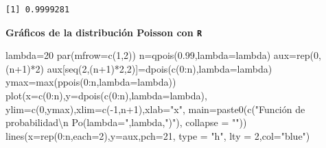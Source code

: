 \documentclass[
  letterpaper,
  DIV=11,
  numbers=noendperiod]{scrreprt}
\newenvironment{Shaded}{\begin{snugshade}}{\end{snugshade}}
\newcommand{\AttributeTok}[1]{\textcolor[rgb]{0.40,0.45,0.13}{#1}}
\newcommand{\DecValTok}[1]{\textcolor[rgb]{0.68,0.00,0.00}{#1}}
\newcommand{\FloatTok}[1]{\textcolor[rgb]{0.68,0.00,0.00}{#1}}
\newcommand{\FunctionTok}[1]{\textcolor[rgb]{0.28,0.35,0.67}{#1}}
\newcommand{\NormalTok}[1]{\textcolor[rgb]{0.00,0.23,0.31}{#1}}
\newcommand{\OtherTok}[1]{\textcolor[rgb]{0.00,0.23,0.31}{#1}}
\newcommand{\SpecialCharTok}[1]{\textcolor[rgb]{0.37,0.37,0.37}{#1}}
\newcommand{\StringTok}[1]{\textcolor[rgb]{0.13,0.47,0.30}{#1}}
\begin{document}
\begin{verbatim}
[1] 0.9999281
\end{verbatim}

\textbf{Gráficos de la distribución Poisson con \texttt{R}}

\begin{Shaded}
\begin{Highlighting}[]
\NormalTok{lambda}\OtherTok{=}\DecValTok{20}
\FunctionTok{par}\NormalTok{(}\AttributeTok{mfrow=}\FunctionTok{c}\NormalTok{(}\DecValTok{1}\NormalTok{,}\DecValTok{2}\NormalTok{))}
\NormalTok{n}\OtherTok{=}\FunctionTok{qpois}\NormalTok{(}\FloatTok{0.99}\NormalTok{,}\AttributeTok{lambda=}\NormalTok{lambda)}
\NormalTok{aux}\OtherTok{=}\FunctionTok{rep}\NormalTok{(}\DecValTok{0}\NormalTok{,(n}\SpecialCharTok{+}\DecValTok{1}\NormalTok{)}\SpecialCharTok{*}\DecValTok{2}\NormalTok{)}
\NormalTok{aux[}\FunctionTok{seq}\NormalTok{(}\DecValTok{2}\NormalTok{,(n}\SpecialCharTok{+}\DecValTok{1}\NormalTok{)}\SpecialCharTok{*}\DecValTok{2}\NormalTok{,}\DecValTok{2}\NormalTok{)]}\OtherTok{=}\FunctionTok{dpois}\NormalTok{(}\FunctionTok{c}\NormalTok{(}\DecValTok{0}\SpecialCharTok{:}\NormalTok{n),}\AttributeTok{lambda=}\NormalTok{lambda)}
\NormalTok{ymax}\OtherTok{=}\FunctionTok{max}\NormalTok{(}\FunctionTok{ppois}\NormalTok{(}\DecValTok{0}\SpecialCharTok{:}\NormalTok{n,}\AttributeTok{lambda=}\NormalTok{lambda))}
\FunctionTok{plot}\NormalTok{(}\AttributeTok{x=}\FunctionTok{c}\NormalTok{(}\DecValTok{0}\SpecialCharTok{:}\NormalTok{n),}\AttributeTok{y=}\FunctionTok{dpois}\NormalTok{(}\FunctionTok{c}\NormalTok{(}\DecValTok{0}\SpecialCharTok{:}\NormalTok{n),}\AttributeTok{lambda=}\NormalTok{lambda),}
     \AttributeTok{ylim=}\FunctionTok{c}\NormalTok{(}\DecValTok{0}\NormalTok{,ymax),}\AttributeTok{xlim=}\FunctionTok{c}\NormalTok{(}\SpecialCharTok{{-}}\DecValTok{1}\NormalTok{,n}\SpecialCharTok{+}\DecValTok{1}\NormalTok{),}\AttributeTok{xlab=}\StringTok{"x"}\NormalTok{,}
     \AttributeTok{main=}\FunctionTok{paste0}\NormalTok{(}\FunctionTok{c}\NormalTok{(}\StringTok{"Función de probabilidad}\SpecialCharTok{\textbackslash{}n}\StringTok{  Po(lambda="}\NormalTok{,lambda,}\StringTok{")"}\NormalTok{),}
                 \AttributeTok{collapse =} \StringTok{""}\NormalTok{))}
\FunctionTok{lines}\NormalTok{(}\AttributeTok{x=}\FunctionTok{rep}\NormalTok{(}\DecValTok{0}\SpecialCharTok{:}\NormalTok{n,}\AttributeTok{each=}\DecValTok{2}\NormalTok{),}\AttributeTok{y=}\NormalTok{aux,}\AttributeTok{pch=}\DecValTok{21}\NormalTok{, }\AttributeTok{type =} \StringTok{"h"}\NormalTok{, }\AttributeTok{lty =} \DecValTok{2}\NormalTok{,}\AttributeTok{col=}\StringTok{"blue"}\NormalTok{)}

\end{Highlighting}
\end{Shaded}
\end{document}

